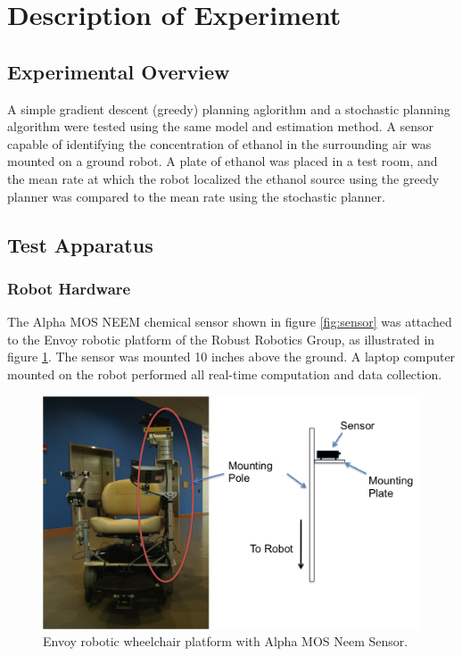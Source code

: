 \documentclass[submit, 12pt]{aiaa-pretty-modified}
\begin{document}
\section{Description of Experiment}
\subsection{Experimental Overview}
A simple gradient descent (greedy) planning aglorithm and a
stochastic planning algorithm were tested using the
same model and estimation method. A sensor capable of identifying the
concentration of ethanol in the surrounding air was mounted on a ground
robot. A plate of ethanol was placed in a test room, and the mean rate at which the robot localized the ethanol source
using the greedy planner was compared to the mean rate using the
stochastic planner.

\subsection{Test Apparatus}
\label{sec:design}
\subsubsection{Robot Hardware}

The Alpha MOS NEEM chemical sensor shown in figure \ref{fig:sensor} was
attached to the Envoy robotic platform of the Robust Robotics Group,
as illustrated in figure \ref{fig:wheelchair}.  The sensor was mounted
10 inches above the ground.  A laptop computer
mounted on the robot performed all real-time computation and data collection.

\begin{figure}
\begin{center}
\includegraphics[width=5in]{img/wheelchair.pdf}
\caption{Envoy robotic wheelchair platform with Alpha MOS Neem Sensor.}
\label{fig:wheelchair}
\end{center}
\end{figure}
\end{document}
